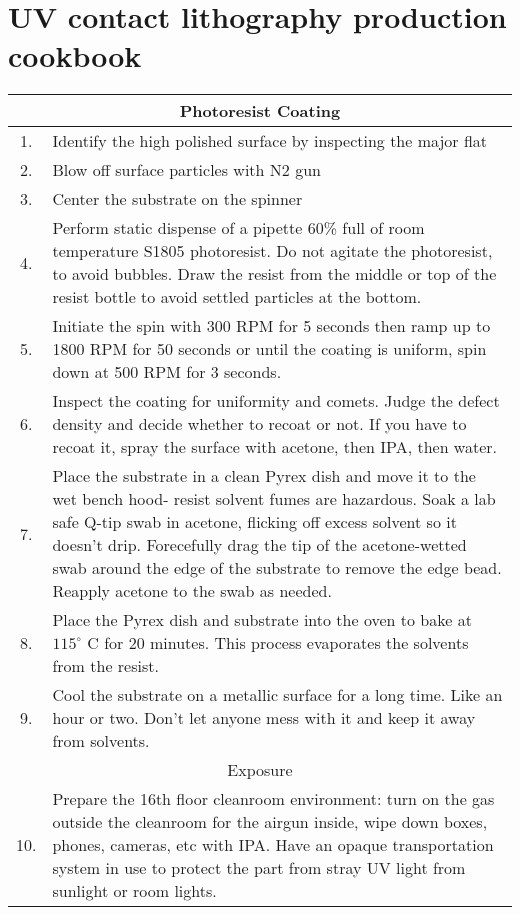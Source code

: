 \chapter{UV contact lithography production cookbook}



\begin{longtable}{cp{15cm}}
	\toprule
	\multicolumn{2}{c}{Photoresist Coating} \\
	\midrule
1.&Identify the high polished surface by inspecting the major flat  \\
2.&Blow off surface particles with N2 gun\\
3.&Center the substrate on the spinner  \\
4.&Perform static dispense of a pipette 60\% full of room temperature S1805 photoresist.  Do not agitate the photoresist, to avoid bubbles.  Draw the resist from the middle or top of the resist bottle to avoid settled particles at the bottom.\\
5.&Initiate the spin with 300 RPM for 5 seconds then ramp up to 1800 RPM for 50 seconds or until the coating is uniform, spin down at 500 RPM for 3 seconds.\\
6.&Inspect the coating for uniformity and comets.  Judge the defect density and decide whether to recoat or not.  If you have to recoat it, spray the surface with acetone, then IPA, then water.\\
7.&Place the substrate in a clean Pyrex dish and move it to the wet bench hood- resist solvent fumes are hazardous.  Soak a lab safe Q-tip swab in acetone, flicking off excess solvent so it doesn't drip.  Forecefully drag the tip of the acetone-wetted swab around the edge of the substrate to remove the edge bead.  Reapply acetone to the swab as needed.\\
8.&Place the Pyrex dish and substrate into the oven to bake at $115^{\circ}$ C for 20 minutes.  This process evaporates the solvents from the resist.\\
9.&Cool the substrate on a metallic surface for a long time.  Like an hour or two.  Don't let anyone mess with it and keep it away from solvents.\\
	\midrule
	\multicolumn{2}{c}{Exposure} \\
	\midrule
10.&Prepare the 16th floor cleanroom environment: turn on the gas outside the cleanroom for the airgun inside, wipe down boxes, phones, cameras, etc with IPA.  Have an opaque transportation system in use to protect the part from stray UV light from sunlight or room lights. \\

\end{longtable}
